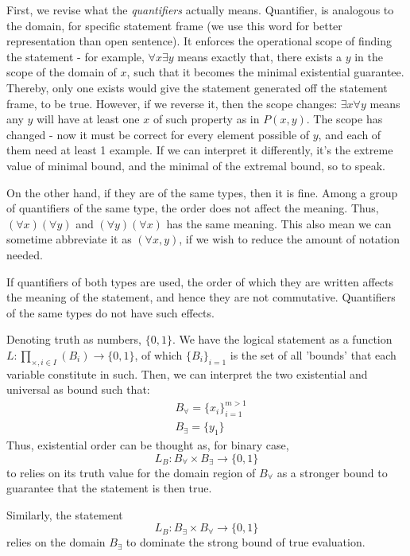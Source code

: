 First, we revise what the \textit{quantifiers} actually means. Quantifier, is analogous to the domain, for specific statement frame (we use this word for better representation than open sentence). It enforces the operational scope of finding the statement - for example, $\forall x \exists y$ means exactly that, there exists a $y$ in the scope of the domain of $x$, such that it becomes the minimal existential guarantee. Thereby, only one exists would give the statement generated off the statement frame, to be true. However, if we reverse it, then the scope changes: $\exists x \forall y$ means any $y$ will have at least one $x$ of such property as in $P(x,y)$. The scope has changed - now it must be correct for every element possible of $y$, and each of them need at least 1 example. If we can interpret it differently, it's the extreme value of minimal bound, and the minimal of the extremal bound, so to speak. 

On the other hand, if they are of the same types, then it is fine. Among a group of quantifiers of the same type, the order does not affect the meaning. Thus, $(\forall x)(\forall y)$ and $(\forall y)(\forall x)$ has the same meaning. This also mean we can sometime abbreviate it as $(\forall x, y)$, if we wish to reduce the amount of notation needed. 

\begin{lemma}
    If quantifiers of both types are used, the order of which they are written affects the meaning of the statement, and hence they are not commutative. Quantifiers of the same types do not have such effects. 
\end{lemma}

\begin{example}
    Denoting truth as numbers, $\{0,1\}$. We have the logical statement as a function $L: \prod_{\times, i \in I} (B_i) \to \{0,1\}$, of which $\{B_i\}_{i=1}$ is the set of all 'bounds' that each variable constitute in such. Then, we can interpret the two existential and universal as bound such that: 
    \begin{align}
        & B_{\forall} = \{x_i\}_{i=1}^{m>1}\\
        & B_{\exists} = \{y_1\} 
    \end{align}
    Thus, existential order can be thought as, for binary case, 
    \begin{equation}
        L_B: B_{\forall} \times B_{\exists} \to \{0,1\} 
    \end{equation}
    to relies on its truth value for the domain region of $B_{\forall}$ as a stronger bound to guarantee that the statement is then true. 

    Similarly, the statement 
    \begin{equation}
        L_B: B_{\exists} \times B_{\forall} \to \{0,1\} 
    \end{equation}
    relies on the domain $B_{\exists}$ to dominate the strong bound of true evaluation. 
\end{example}

